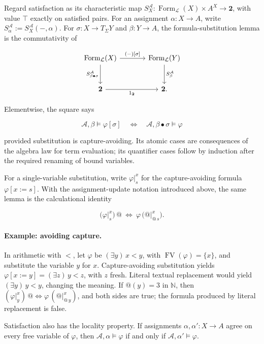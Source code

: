 \documentclass[11pt]{article}
\makeatletter
\newcommand{\atsign}{\mathord{@}}
\makeatother
\begin{document}
Regard satisfaction as its characteristic map
\(S_X^{\mathcal A}:\operatorname{Form}_{\mathcal L}(X)\times A^X
\to\mathbf 2\), with value \(\top\) exactly on satisfied pairs. For an
assignment \(\alpha:X\to A\), write
\(S_\alpha^{\mathcal A}:=S_X^{\mathcal A}(-,\alpha)\). For
\(\sigma:X\to T_\Sigma Y\) and \(\beta:Y\to A\), the formula-substitution
lemma is the commutativity of

\[
\begin{tikzcd}[row sep=large,column sep=large]
\operatorname{Form}_{\mathcal L}(X)
  \arrow[r,"{(-)[\sigma]}"]
  \arrow[d,swap,"S_{\beta\bullet\sigma}^{\mathcal A}"] &
\operatorname{Form}_{\mathcal L}(Y)
  \arrow[d,"S_\beta^{\mathcal A}"] \\
\mathbf 2 \arrow[r,"1_{\mathbf 2}"'] & \mathbf 2.
\end{tikzcd}
\]

Elementwise, the square says

\[
\boxed{
\mathcal A,\beta\models\varphi[\sigma]
\quad\Longleftrightarrow\quad
\mathcal A,\beta\bullet\sigma\models\varphi
}
\]

provided substitution is capture-avoiding. Its atomic cases are
consequences of the algebra law for term evaluation; its quantifier
cases follow by induction after the required renaming of bound
variables.

For a single-variable substitution, write \(\varphi\vert_s^x\) for the
capture-avoiding formula \(\varphi[x:=s]\). With the assignment-update notation
introduced above, the same lemma is the calculational identity

\[
\boxed{
\bigl(\varphi\vert_s^x\bigr)\,\atsign
\ \Longleftrightarrow\ 
\varphi\,\bigl(\atsign\vert_{\atsign\,s}^x\bigr).
}
\]

\paragraph{Example: avoiding capture.}
In arithmetic with \(<\), let \(\varphi\) be \((\exists y)\,x<y\), with
\(\operatorname{FV}(\varphi)=\{x\}\), and substitute the variable \(y\) for \(x\).
Capture-avoiding substitution yields
\(\varphi[x:=y]=(\exists z)\,y<z\), with \(z\) fresh. Literal textual
replacement would yield \((\exists y)\,y<y\), changing the meaning. If
\(\atsign(y)=3\) in \(\mathbb N\), then
\((\varphi\vert_y^x)\,\atsign\Longleftrightarrow
\varphi\,(\atsign\vert_{\atsign\,y}^x)\), and both sides are true; the formula produced
by literal replacement is false.

Satisfaction also has the locality property. If assignments
\(\alpha,\alpha':X\to A\) agree on every free variable of \(\varphi\),
then \(\mathcal A,\alpha\models\varphi\) if and only if
\(\mathcal A,\alpha'\models\varphi\).
\end{document}
